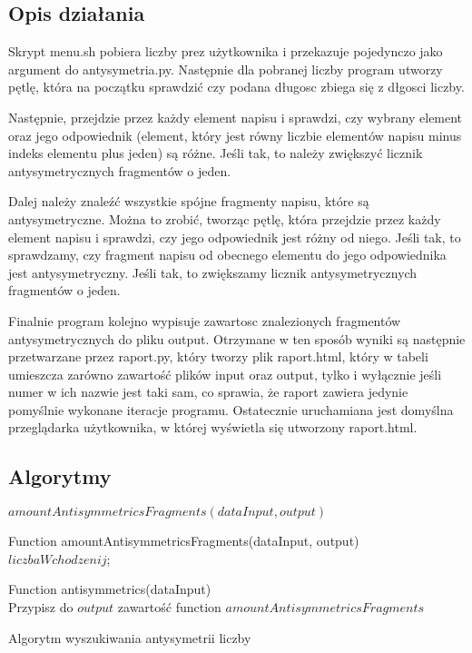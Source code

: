 \documentclass[12pt,a4paper]{article}
\begin{document}
	\subsection*{Opis działania} 
Skrypt menu.sh pobiera liczby prez użytkownika i przekazuje pojedynczo jako argument do antysymetria.py. Następnie dla pobranej liczby program utworzy pętlę, która na początku sprawdzić czy podana długosc zbiega się z dłgosci liczby.

Następnie, przejdzie przez każdy element napisu i sprawdzi, czy wybrany element oraz jego odpowiednik (element, który jest równy liczbie elementów napisu minus indeks elementu plus jeden) są różne. Jeśli tak, to należy zwiększyć licznik antysymetrycznych fragmentów o jeden.

Dalej należy znaleźć wszystkie spójne fragmenty napisu, które są antysymetryczne. Można to zrobić, tworząc pętlę, która przejdzie przez każdy element napisu i sprawdzi, czy jego odpowiednik jest różny od niego. Jeśli tak, to sprawdzamy, czy fragment napisu od obecnego elementu do jego odpowiednika jest antysymetryczny. Jeśli tak, to zwiększamy licznik antysymetrycznych fragmentów o jeden.

Finalnie program kolejno wypisuje zawartosc znalezionych fragmentów antysymetrycznych do pliku output.
Otrzymane w ten sposób wyniki są następnie przetwarzane przez raport.py, który tworzy plik raport.html, który w tabeli umieszcza zarówno zawartość plików input oraz output, tylko
i wyłącznie jeśli numer w ich nazwie jest taki sam, co sprawia, że raport zawiera jedynie pomyślnie wykonane iteracje programu. Ostatecznie uruchamiana jest domyślna przeglądarka użytkownika, w której wyświetla się
utworzony raport.html.
	
    
	\subsection*{Algorytmy}
	
	\begin{algorithm}[H]
		
		 $amountAntisymmetricsFragments(dataInput, output)$
		
		Function amountAntisymmetricsFragments(dataInput, output)\\
		\Return $liczbaWchodzenij$;
		
    	Function antisymmetrics(dataInput)\\
		Przypisz do $output$ zawartość function $amountAntisymmetricsFragments$
		\caption{Algorytm wyszukiwania antysymetrii liczby}
	\end{algorithm}
	
\end{document}
